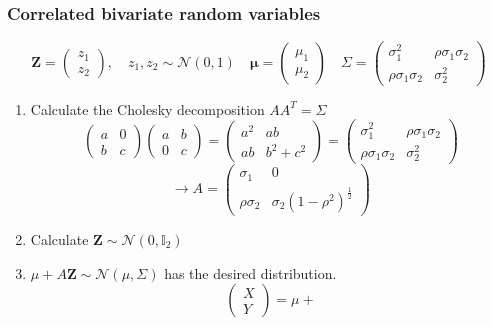 \documentclass[10pt, serif, mathserif]{beamer}
\begin{document}
\begin{frame}
  \frametitle{Correlated bivariate random variables}
  \[
    \mathbf{Z} = \left(\begin{matrix} z_1 \\ z_2 \end{matrix} \right), \quad z_1, z_2 \sim \mathcal{N}(0,1)
    \quad
    \mathbf{\mu} = \left(\begin{matrix} \mu_1 \\ \mu_2 \end{matrix} \right)
    \quad
    \Sigma = \left(\begin{matrix} \sigma_1^2 & \rho\sigma_1\sigma_2 \\ \rho\sigma_1\sigma_2 & \sigma_2^2 \end{matrix} \right)
  \]
  \begin{enumerate}
    \item Calculate the Cholesky decomposition $AA^T = \Sigma$
      \[
        \left(\begin{matrix} a & 0 \\ b & c \end{matrix} \right)
        \left(\begin{matrix} a & b \\ 0 & c \end{matrix} \right) =
        \left(\begin{matrix} a^2 & ab \\ ab & b^2 + c^2 \end{matrix} \right)
        = \left(\begin{matrix} \sigma_1^2 & \rho\sigma_1\sigma_2 \\ \rho\sigma_1\sigma_2 & \sigma_2^2 \end{matrix} \right)
      \] \[
        \rightarrow A = \left(\begin{matrix} \sigma_1 & 0 \\ \rho\sigma_2 & \sigma_2(1-\rho^2)^{\frac{1}{2}} \end{matrix} \right)
      \]
    \item Calculate $\mathbf{Z} \sim\mathcal{N}(0,\mathbb{I}_2)$
    \item $\mu + A\mathbf{Z} \sim \mathcal{N}(\mu,\Sigma)$ has the desired distribution.
      \[
        \left( \begin{matrix}X \\ Y \end{matrix} \right) = 
        \mu + %
\]
\end{enumerate}
\end{frame}
\end{document}
